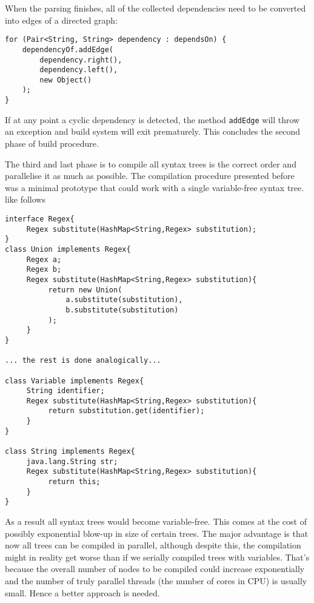 When the parsing finishes, all of the collected dependencies need to be converted into edges of a directed graph:
\begin{lstlisting}
for (Pair<String, String> dependency : dependsOn) {
    dependencyOf.addEdge(
        dependency.right(), 
        dependency.left(), 
        new Object()
    );
}
\end{lstlisting}
If at any point a cyclic dependency is detected, the method \texttt{addEdge} will throw an exception and build system will exit prematurely.
This concludes the second phase of build procedure. 

The third and last phase is to compile all syntax trees is the correct order and parallelise it as much as possible. The compilation procedure presented before was a minimal prototype that could work with a single variable-free syntax tree.
like follows
\begin{lstlisting}
interface Regex{
     Regex substitute(HashMap<String,Regex> substitution);
}
class Union implements Regex{
     Regex a; 
     Regex b;
     Regex substitute(HashMap<String,Regex> substitution){
          return new Union(
              a.substitute(substitution),
              b.substitute(substitution)
          );
     }
}

... the rest is done analogically...

class Variable implements Regex{
     String identifier;
     Regex substitute(HashMap<String,Regex> substitution){
          return substitution.get(identifier);
     }
}

class String implements Regex{
     java.lang.String str;
     Regex substitute(HashMap<String,Regex> substitution){
          return this;
     }
}
\end{lstlisting}
 As a result all syntax trees would become variable-free. This comes at the cost of possibly exponential blow-up in size of certain trees. The major advantage is that now all trees can be compiled in parallel, although despite this, the compilation might in reality get worse than if we serially compiled trees with variables. That's because the overall number of nodes to be compiled could increase exponentially and the number of truly parallel threads (the number of cores in CPU) is usually small. Hence a better approach is needed. 
 
